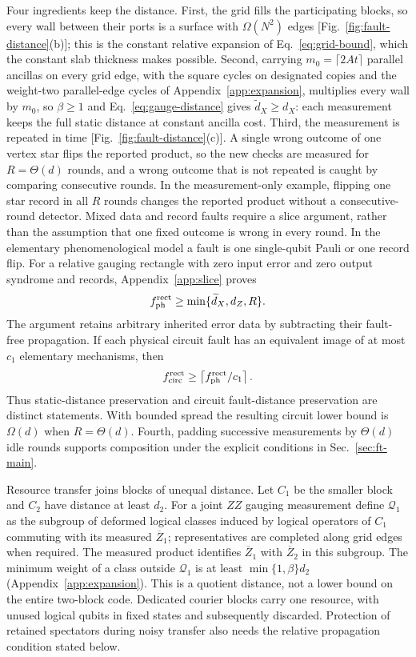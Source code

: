 Four ingredients keep the distance.  First, the grid fills the
participating blocks, so every wall between their ports is a surface with
$\Omega(N^2)$ edges [Fig.~\ref{fig:fault-distance}(b)]; this is the constant
relative expansion of Eq.~\eqref{eq:grid-bound}, which the constant slab
thickness makes possible.  Second, carrying $m_0=\lceil2At\rceil$ parallel
ancillas on every grid edge, with the square cycles on designated copies
and the weight-two parallel-edge cycles of Appendix~\ref{app:expansion},
multiplies every wall by $m_0$, so $\beta\ge1$
and Eq.~\eqref{eq:gauge-distance} gives $\widetilde d_X\ge d_X$: each
measurement keeps the full static distance at constant ancilla cost.  Third, the
measurement is repeated in time [Fig.~\ref{fig:fault-distance}(c)].  A single
wrong outcome of one vertex star flips the reported product, so the new
checks are measured for $R=\Theta(d)$ rounds, and a wrong outcome that is
not repeated is caught by comparing consecutive rounds.  In the measurement-only example, flipping one star record in all $R$
rounds changes the reported product without a consecutive-round detector.
Mixed data and record faults require a slice argument, rather than the
assumption that one fixed outcome is wrong in every round. In the elementary
phenomenological model a fault is one single-qubit Pauli or one record flip.
For a relative gauging rectangle with zero input error and zero output
syndrome and records, Appendix~\ref{app:slice} proves
\begin{equation}
 f_{\rm ph}^{\rm rect}\ge\min\{\widetilde d_X,d_Z,R\}.
 \label{eq:rect-distance}
\end{equation}
The argument retains arbitrary inherited error data by subtracting their
fault-free propagation. If each physical circuit fault has an equivalent
image of at most $c_1$ elementary mechanisms, then
\begin{equation}
 f_{\rm circ}^{\rm rect}\ge
 \left\lceil f_{\rm ph}^{\rm rect}/c_1\right\rceil.
 \label{eq:circuit-conversion}
\end{equation}
Thus static-distance preservation and circuit fault-distance preservation
are distinct statements. With bounded spread the resulting circuit lower
bound is $\Omega(d)$ when $R=\Theta(d)$. Fourth, padding successive
measurements by $\Theta(d)$ idle rounds supports composition under the
explicit conditions in Sec.~\ref{sec:ft-main}.

Resource transfer joins blocks of unequal distance. Let $C_1$ be the
smaller block and $C_2$ have distance at least $d_2$. For a joint $ZZ$
gauging measurement define $\mathcal Q_1$ as the subgroup of deformed
logical classes induced by logical operators of $C_1$ commuting with its
measured $\overline Z_1$; representatives are completed along grid edges
when required. The measured product identifies
$\overline Z_1$ with $\overline Z_2$ in this subgroup. The minimum weight
of a class outside $\mathcal Q_1$ is at least
$\min\{1,\beta\}d_2$ (Appendix~\ref{app:expansion}). This is a quotient
distance, not a lower bound on the entire two-block code. Dedicated courier
blocks carry one resource, with unused logical qubits in fixed states and
subsequently discarded. Protection of retained spectators during noisy
transfer also needs the relative propagation condition stated below.

